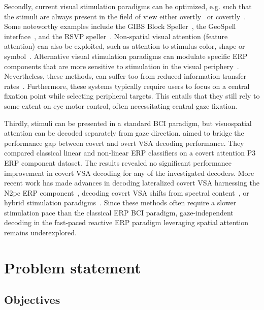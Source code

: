 Secondly, current visual stimulation paradigms can be optimized, e.g. such that
the stimuli are always present in the field of view either overtly~\cite{Acqualagna2013, Won2018,
Lin2018} or covertly~\cite{Treder2010,Pires2011,Lees2018}. Some noteworthy examples include the GIBS Block Speller~\parencite{Pires2011},
the GeoSpell interface~\parencite{Aloise2012}, and the RSVP
speller~\parencite{Acqualagna2011}.
Non-spatial visual attention (feature attention) can also be exploited, such as
attention to stimulus color, shape or symbol~\cite{Zhang2010,Treder2011,Hwang2015}.
Alternative visual stimulation paradigms can modulate specific ERP components
that are more sensitive to stimulation in the visual periphery~\cite{Schaeff2012,Xu2022}.
Nevertheless, these methods, can suffer too from reduced information
transfer rates~\cite{Chennu2013}.
Furthermore, these systems typically require users to focus on a central fixation point while
selecting peripheral targets.
This entails that they still rely to some extent on
eye motor control, often necessitating central gaze fixation.

Thirdly, stimuli can be presented in a standard BCI paradigm, but visuospatial
attention can be decoded separately from gaze direction.
\cite{Aloise2012b} aimed to bridge the performance gap between covert and
overt VSA decoding performance.
They compared classical linear and non-linear ERP classifiers on a covert
attention P3 ERP component dataset.
The results revealed no significant performance improvement in covert VSA
decoding for any of the investigated decoders.
More recent work has made advances in decoding lateralized covert
VSA harnessing the N2pc ERP component~\cite{Thiery2016,Reichert2020b,Wang2022},
decoding covert VSA shifts from spectral content~\cite{Tonin2013}, or hybrid
stimulation paradigms~\cite{Egan2017}.
Since these methods often require a slower stimulation pace than the classical
ERP BCI paradigm, gaze-independent decoding in the fast-paced reactive ERP paradigm
leveraging spatial attention remains underexplored.


\section{Problem statement}

\subsection{Objectives}

